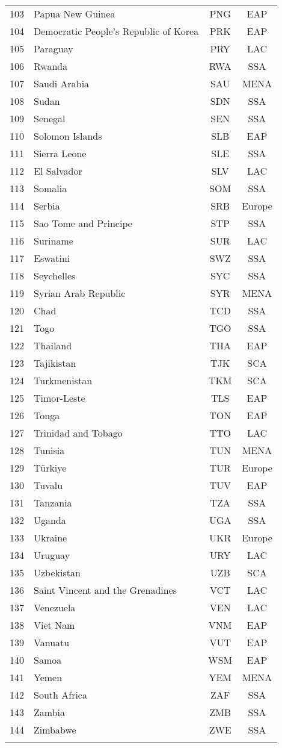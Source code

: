 {\begin{longtable}{l l c c}
  103 & Papua New Guinea & PNG & EAP \\ 
  104 & Democratic People's Republic of Korea & PRK & EAP \\ 
  105 & Paraguay & PRY & LAC \\ 
  106 & Rwanda & RWA & SSA \\ 
  107 & Saudi Arabia & SAU & MENA \\ 
  108 & Sudan & SDN & SSA \\ 
  109 & Senegal & SEN & SSA \\ 
  110 & Solomon Islands & SLB & EAP \\ 
  111 & Sierra Leone & SLE & SSA \\ 
  112 & El Salvador & SLV & LAC \\ 
  113 & Somalia & SOM & SSA \\ 
  114 & Serbia & SRB & Europe \\ 
  115 & Sao Tome and Principe & STP & SSA \\ 
  116 & Suriname & SUR & LAC \\ 
  117 & Eswatini & SWZ & SSA \\ 
  118 & Seychelles & SYC & SSA \\ 
  119 & Syrian Arab Republic & SYR & MENA \\ 
  120 & Chad & TCD & SSA \\ 
  121 & Togo & TGO & SSA \\ 
  122 & Thailand & THA & EAP \\ 
  123 & Tajikistan & TJK & SCA \\ 
  124 & Turkmenistan & TKM & SCA \\ 
  125 & Timor-Leste & TLS & EAP \\ 
  126 & Tonga & TON & EAP \\ 
  127 & Trinidad and Tobago & TTO & LAC \\ 
  128 & Tunisia & TUN & MENA \\ 
  129 & Türkiye & TUR & Europe \\ 
  130 & Tuvalu & TUV & EAP \\ 
  131 & Tanzania & TZA & SSA \\ 
  132 & Uganda & UGA & SSA \\ 
  133 & Ukraine & UKR & Europe \\ 
  134 & Uruguay & URY & LAC \\ 
  135 & Uzbekistan & UZB & SCA \\ 
  136 & Saint Vincent and the Grenadines & VCT & LAC \\ 
  137 & Venezuela & VEN & LAC \\ 
  138 & Viet Nam & VNM & EAP \\ 
  139 & Vanuatu & VUT & EAP \\ 
  140 & Samoa & WSM & EAP \\ 
  141 & Yemen & YEM & MENA \\ 
  142 & South Africa & ZAF & SSA \\ 
  143 & Zambia & ZMB & SSA \\ 
  144 & Zimbabwe & ZWE & SSA \\ 
   \hline
\label{tab:country_info}
\end{longtable}

}